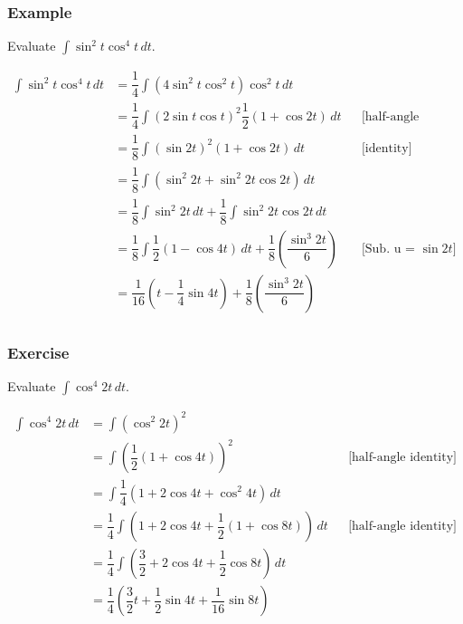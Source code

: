 \documentclass[t]{beamer}
\theoremstyle{plain}
\theoremstyle{definition}
\newcommand{\ds}{\displaystyle}
\begin{document}
\begin{frame}
\frametitle{Example} 

\footnotesize

Evaluate $\ds\int\sin^2t \cos^4{t} \,dt$.  \pause

\begin{align*}
\ds\int\sin^2t \cos^4{t} \,dt &= \dfrac{1}{4} \int (4 \sin^2{t} \cos^2{t}) \cos^2{t} \,dt  \\
                                               &= \dfrac{1}{4} \int (2 \sin{t} \cos{t})^2 \dfrac{1}{2}(1 + \cos{2t}) \,dt && \text{[half-angle identity]}\\
                                               &= \dfrac{1}{8} \int (\sin{2t})^2 (1 + \cos{2t}) \,dt &&\text{[identity]}\\
                                               &= \dfrac{1}{8} \int (\sin^2{2t} + \sin^2{2t}\cos{2t})\,dt \\
	                                           &= \dfrac{1}{8} \int \sin^2{2t}\,dt + \dfrac{1}{8} \int  \sin^2{2t}\cos{2t}\,dt \\
	                                           &= \dfrac{1}{8} \int \dfrac{1}{2}(1 - \cos{4t})\,dt + \dfrac{1}{8} \left(\dfrac{\sin^3{2t}}{6} \right) && \text{[Sub. u = $\sin{2t}$]}\\
	                                           &= \dfrac{1}{16} \left(t - \dfrac{1}{4}\sin{4t}\right) + \dfrac{1}{8}\left(\dfrac{\sin^3{2t}}{6} \right) \\
\end{align*}

\end{frame}

\begin{frame}
\frametitle{Exercise} 

\footnotesize

Evaluate $\ds\int\cos^4{2t} \,dt$.  \pause

\begin{align*}
\ds\int\cos^4{2t} \,dt &=  \ds\int (\cos^2{2t})^2\\
 									  &= \ds\int \left(\dfrac{1}{2}(1 + \cos{4t})\right)^2 && \text{[half-angle identity}] \\
 									  &= \ds\int \dfrac{1}{4}(1 + 2 \cos{4t} + \cos^2{4t})\,dt\\
 									 &= \dfrac{1}{4}\ds\int (1 + 2 \cos{4t} + \dfrac{1}{2}(1 + \cos{8t}))\,dt && \text{[half-angle identity}] \\
 									 &= \dfrac{1}{4}\ds\int (\dfrac{3}{2} + 2 \cos{4t} + \dfrac{1}{2}\cos{8t})\,dt \\
 									 &= \dfrac{1}{4}\left(\dfrac{3}{2}t + \dfrac{1}{2}\sin{4t} + \dfrac{1}{16}\sin{8t}\right)
\end{align*}

\end{frame}
\end{document}

